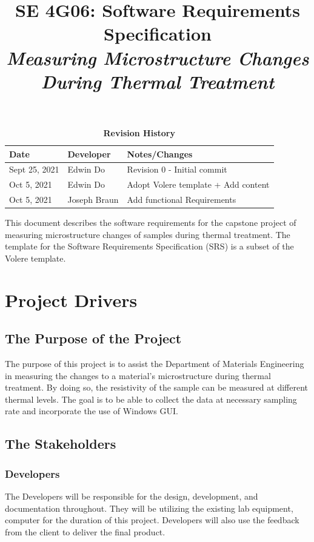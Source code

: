 \documentclass[12pt, titlepage]{article}
\title{SE 4G06: Software Requirements Specification\\\textit{Measuring Microstructure Changes During Thermal Treatment }}
\author{\authname}
\date{}
\begin{document}
\maketitle

\tableofcontents
\listoftables
\listoffigures

\begin{table}[H]
\caption{\bf Revision History}
\begin{tabularx}{\textwidth}{p{2.5cm}p{2.5cm}X}
\toprule {\bf Date} & {\bf Developer} & {\bf Notes/Changes}\\
\midrule
Sept 25, 2021 & Edwin Do & Revision 0 - Initial commit\\
Oct 5, 2021 & Edwin Do & Adopt Volere template + Add content \\
Oct 5, 2021 & Joseph Braun & Add functional Requirements \\ 

\bottomrule
\end{tabularx}
\end{table}

\newpage


This document describes the software requirements for the capstone project of measuring microstructure changes of samples during thermal treatment. The template for the Software Requirements Specification (SRS) is a subset of the Volere
template.


\section{Project Drivers}

\subsection{The Purpose of the Project}
The purpose of this project is to assist the Department of Materials Engineering in measuring the changes to a material's microstructure during thermal treatment. 
By doing so, the resistivity of the sample can be measured at different thermal levels. The goal is to be able to collect the data at necessary sampling rate and 
incorporate the use of Windows GUI. 

\subsection{The Stakeholders}

\subsubsection{Developers}
The Developers will be responsible for the design, development, and documentation throughout. They will be utilizing the existing lab equipment, computer for the duration of this project.
Developers will also use the feedback from the client to deliver the final product. 
\end{document}
